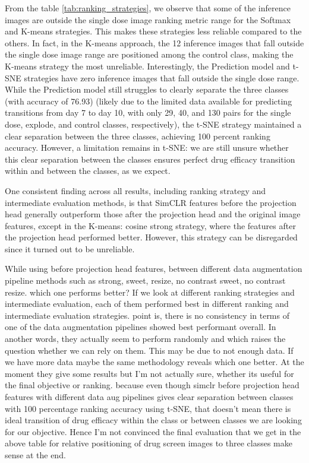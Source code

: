 From the table \ref{tab:ranking_strategies}, we observe that some of the inference images are outside the single dose image ranking metric range for the Softmax and K-means strategies. This makes these strategies less reliable compared to the others. In fact, in the K-means approach, the 12 inference images that fall outside the single dose image range are positioned among the control class, making the K-means strategy the most unreliable. Interestingly, the Prediction model and t-SNE strategies have zero inference images that fall outside the single dose range. While the Prediction model still struggles to clearly separate the three classes (with accuracy of 76.93) (likely due to the limited data available for predicting transitions from day 7 to day 10, with only 29, 40, and 130 pairs for the single dose, explode, and control classes, respectively), the t-SNE strategy maintained a clear separation between the three classes, achieving 100 percent ranking accuracy. However, a limitation remains in t-SNE: we are still unsure whether this clear separation between the classes ensures perfect drug efficacy transition within and between the classes, as we expect.

One consistent finding across all results, including ranking strategy and intermediate evaluation methods, is that SimCLR features before the projection head generally outperform those after the projection head and the original image features, except in the K-means: cosine strong strategy, where the features after the projection head performed better. However, this strategy can be disregarded since it turned out to be unreliable.

While using before projection head features, between different data augmentation pipeline methods such as strong, sweet, resize, no contrast sweet, no contrast resize. which one performs better? If we look at different ranking strategies and intermediate evaluation, each of them performed best in different ranking and intermediate evaluation strategies. point is, there is no consistency in terms of one of the data augmentation pipelines showed best performant overall. In another words, they actually seem to perform randomly and which raises the question whether we can rely on them. This may be due to not enough data. If we have more data maybe the same methodology reveals which one better. At the moment they give some results but I'm not actually sure, whether its useful for the final objective or ranking. because even though simclr before projection head features with different  data aug pipelines gives clear separation between classes with 100 percentage ranking accuracy using t-SNE, that doesn't mean there is ideal transition of drug efficacy within the class or between classes we are looking for our objective. Hence I'm not convinced the final evaluation that we get in the above table for relative positioning of drug screen images to three classes make sense at the end. 

